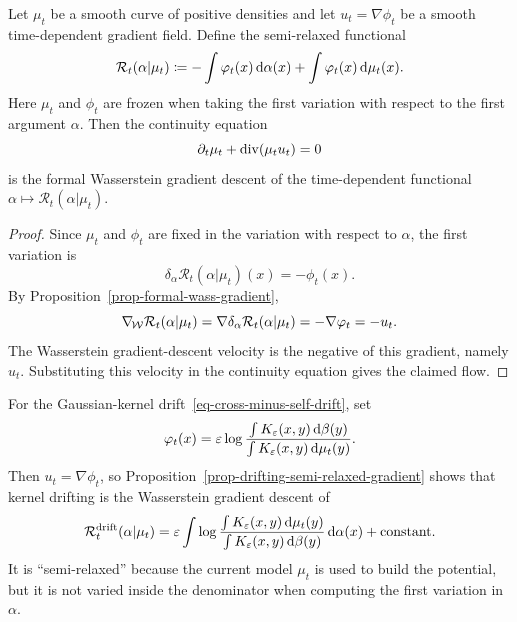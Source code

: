 \begin{prop}\label{prop-drifting-semi-relaxed-gradient}
	Let $\mu_t$ be a smooth curve of positive densities and let $u_t=\nabla\phi_t$ be a smooth time-dependent gradient field. Define the semi-relaxed functional
	\begin{equation}\label{eq-semi-relaxed-drift-functional}
		\mathcal R_t(\alpha|\mu_t)
		\coloneqq
		-\int \varphi_t(x)\,\mathrm{d}\alpha(x)
		+\int \varphi_t(x)\,\mathrm{d}\mu_t(x).
	\end{equation}
	Here $\mu_t$ and $\phi_t$ are frozen when taking the first variation with respect to the first argument $\alpha$. Then the continuity equation
	\[
		\partial_t\mu_t+\operatorname{div}(\mu_t u_t)=0
	\]
	is the formal Wasserstein gradient descent of the time-dependent functional $\alpha\mapsto\mathcal R_t(\alpha|\mu_t)$.
\end{prop}

\begin{proof}
	Since $\mu_t$ and $\phi_t$ are fixed in the variation with respect to $\alpha$, the first variation is
	\[
		\delta_\alpha \mathcal R_t(\alpha|\mu_t)(x)=-\phi_t(x).
	\]
	By Proposition~\ref{prop-formal-wass-gradient},
	\[
		\nabla_{\!\operatorname{\mathcal{W}}} \mathcal R_t(\alpha|\mu_t)
		=
		\nabla\delta_\alpha \mathcal R_t(\alpha|\mu_t)
		=
		-\nabla\varphi_t
		=
		-u_t.
	\]
	The Wasserstein gradient-descent velocity is the negative of this gradient, namely $u_t$. Substituting this velocity in the continuity equation gives the claimed flow.
\end{proof}

\begin{example}
	For the Gaussian-kernel drift~\eqref{eq-cross-minus-self-drift}, set
	\[
		\varphi_t(x)=
		\varepsilon\log
		\frac{\int K_\varepsilon(x,y)\,\mathrm{d}\beta(y)}
		     {\int K_\varepsilon(x,y)\,\mathrm{d}\mu_t(y)}.
	\]
	Then $u_t=\nabla\phi_t$, so Proposition~\ref{prop-drifting-semi-relaxed-gradient} shows that kernel drifting is the Wasserstein gradient descent of
	\[
		\mathcal R_t^{\mathrm{drift}}(\alpha|\mu_t)
		=
		\varepsilon
		\int
		\log
		\frac{\int K_\varepsilon(x,y)\,\mathrm{d}\mu_t(y)}
		     {\int K_\varepsilon(x,y)\,\mathrm{d}\beta(y)}
		\,\mathrm{d}\alpha(x)
		+\mathrm{constant}.
	\]
	It is ``semi-relaxed'' because the current model $\mu_t$ is used to build the potential, but it is not varied inside the denominator when computing the first variation in $\alpha$.
\end{example}

